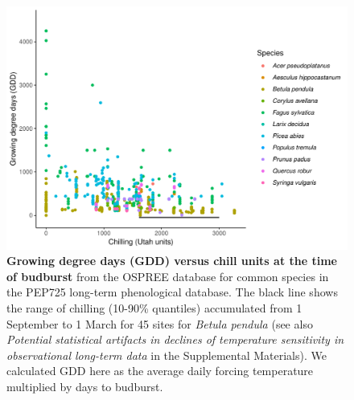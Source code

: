 \documentclass{article}
\begin{document}
\begin{figure}[h!]
\centering
\noindent \includegraphics[width=1\textwidth]{..//..//analyses/bb_analysis/figures/EDFig10_gddbyutah_pepspp.pdf}
\caption{\textbf{Growing degree days (GDD) versus chill units at the time of budburst} from the OSPREE database for common species in the PEP725 long-term phenological database. The black line shows the range of chilling (10-90\% quantiles) accumulated from 1 September to 1 March for 45 sites for \emph{Betula pendula} (see also \emph{Potential statistical artifacts in declines of temperature sensitivity in observational long-term data} in the Supplemental Materials). We calculated GDD here as the average daily forcing temperature multiplied by days to budburst.}
\label{fig:pepgddchill}
\end{figure}

\end{document}

